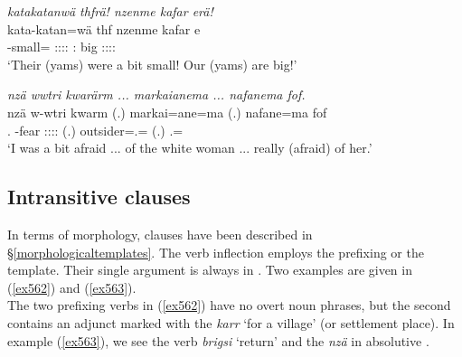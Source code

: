 \begin{exe}
	\ex \emph{katakatanwä thfrä! nzenme kafar erä!}\\
	\gll kata-katan=wä thf nzenme kafar e\\
	\Redup-small=\Emph{} \Tpl:\Sbj:\Rpst:\Ipfv:\Cop{} \Fnsg:\Poss{} big \Tpl:\Sbj:\Nonpast:\Ipfv:\Cop\\
	\trans `Their (yams) were a bit small! Our (yams) are big!'
	\label{ex746}
\end{exe}
\begin{exe}
	\ex \emph{nzä wwtri kwarärm ... markaianema ... nafanema fof.}\\
	\gll nzä w-wtri kwarm (.) markai=ane=ma (.) nafane=ma fof\\
	\Fsg.\Abs{} \Redup-fear \Fsg:\Sbj:\Pst:\Dur:\Cop{} (.) outsider=\Poss.\Sg=\Char{} (.) \Tsg.\Poss=\Char{} \Emph\\
	\trans `I was a bit afraid ... of the white woman ... really (afraid) of her.'\\
	\label{ex747}
\end{exe}

\subsection{Intransitive clauses}\label{intransitiveclauses}

In terms of  morphology,  clauses have been described in \S{}\ref{morphologicaltemplates}. The verb inflection employs the prefixing or the  template. Their single argument is always in  . Two examples are given in (\ref{ex562}) and (\ref{ex563}).\\

The two prefixing verbs in (\ref{ex562}) have no overt  noun phrases, but the second  contains an adjunct marked with the   \emph{karr} `for a village' (or settlement place). In example (\ref{ex563}), we see the  verb \emph{brigsi} `return' and the   \emph{nzä} in absolutive .

